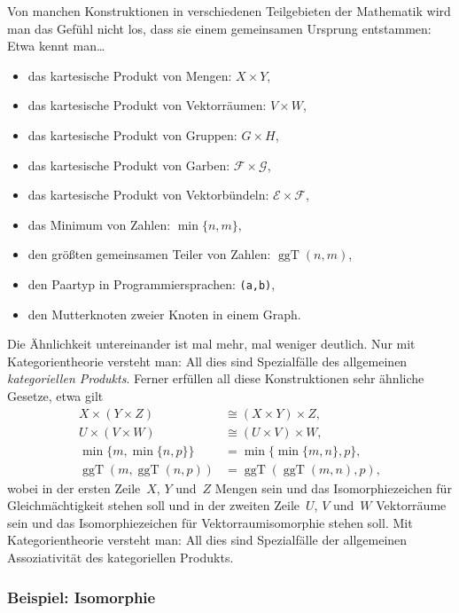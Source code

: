 \documentclass[a4paper,ngerman]{scrartcl}
\theoremstyle{definition}
\theoremstyle{plain}
\theoremstyle{remark}
\DeclareMathOperator{\ggT}{ggT}
\begin{document}
Von manchen Konstruktionen in verschiedenen Teilgebieten der Mathematik wird
man das Gefühl nicht los, dass sie einem gemeinsamen Ursprung entstammen: Etwa
kennt man\ldots
\begin{itemize}
  \item das kartesische Produkt von Mengen: $X \times Y$,
  \item das kartesische Produkt von Vektorräumen: $V \times W$,
  \item das kartesische Produkt von Gruppen: $G \times H$,
  \item das kartesische Produkt von Garben: $\mathcal{F} \times \mathcal{G}$,
  \item das kartesische Produkt von Vektorbündeln: $\mathcal{E} \times \mathcal{F}$,
  \item das Minimum von Zahlen: $\min\{n,m\}$,
  \item den größten gemeinsamen Teiler von Zahlen: $\ggT(n,m)$,
  \item den Paartyp in Programmiersprachen: \texttt{(a,b)},
  \item den Mutterknoten zweier Knoten in einem Graph.
\end{itemize}
Die Ähnlichkeit untereinander ist mal mehr, mal weniger deutlich. Nur mit
Kategorientheorie versteht man: All dies sind Spezialfälle des allgemeinen
\emph{kategoriellen Produkts}. Ferner erfüllen all diese Konstruktionen sehr
ähnliche Gesetze, etwa gilt
\begin{align*}
  X \times (Y \times Z) &\cong (X \times Y) \times Z, \\
  U \times (V \times W) &\cong (U \times V) \times W, \\
  \min\{m,\min\{n,p\}\} &= \min\{\min\{m,n\},p\}, \\
  \ggT(m,\ggT(n,p)) &= \ggT(\ggT(m,n),p),
\end{align*}
wobei in der ersten Zeile~$X$, $Y$ und~$Z$ Mengen sein und das
Isomorphiezeichen für Gleichmächtigkeit stehen soll und in der zweiten
Zeile~$U$, $V$ und~$W$ Vektorräume sein und das Isomorphiezeichen für
Vektorraumisomorphie stehen soll. Mit Kategorientheorie versteht man:
All dies sind Spezialfälle der allgemeinen Assoziativität des kategoriellen
Produkts.

\subsubsection*{Beispiel: Isomorphie}
\end{document}
